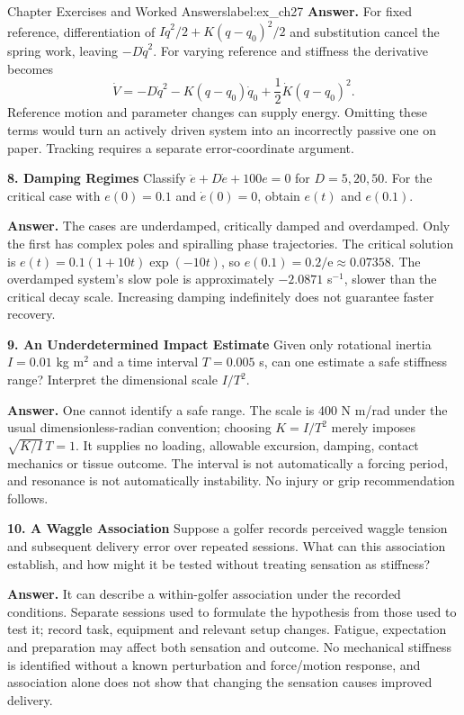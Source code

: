 \begin{exercises}{Chapter Exercises and Worked Answers}{label:ex_ch27}
\textbf{Answer.} For fixed reference, differentiation of $I\dot q^2/2+K(q-q_0)^2/2$ and substitution cancel the spring work, leaving $-D\dot q^2$. For varying reference and stiffness the derivative becomes
\[
\dot V=-D\dot q^2-K(q-q_0)\dot q_0+\frac12\dot K(q-q_0)^2.
\]
Reference motion and parameter changes can supply energy. Omitting these terms would turn an actively driven system into an incorrectly passive one on paper. Tracking requires a separate error-coordinate argument.

\textbf{8. Damping Regimes}
\label{ex:phase_portrait}
Classify $\ddot e+D\dot e+100e=0$ for $D=5,20,50$. For the critical case with $e(0)=0.1$ and $\dot e(0)=0$, obtain $e(t)$ and $e(0.1)$.

\textbf{Answer.} The cases are underdamped, critically damped and overdamped. Only the first has complex poles and spiralling phase trajectories. The critical solution is $e(t)=0.1(1+10t)\exp(-10t)$, so $e(0.1)=0.2/\mathrm e\approx0.07358$. The overdamped system's slow pole is approximately $-2.0871$ s$^{-1}$, slower than the critical decay scale. Increasing damping indefinitely does not guarantee faster recovery.

\textbf{9. An Underdetermined Impact Estimate}
\label{ex:impedance_tuning}
Given only rotational inertia $I=0.01$ kg m$^2$ and a time interval $T=0.005$ s, can one estimate a safe stiffness range? Interpret the dimensional scale $I/T^2$.

\textbf{Answer.} One cannot identify a safe range. The scale is 400 N m/rad under the usual dimensionless-radian convention; choosing $K=I/T^2$ merely imposes $\sqrt{K/I}\,T=1$. It supplies no loading, allowable excursion, damping, contact mechanics or tissue outcome. The interval is not automatically a forcing period, and resonance is not automatically instability. No injury or grip recommendation follows.

\textbf{10. A Waggle Association}
\label{ex:waggle_experiment}
Suppose a golfer records perceived waggle tension and subsequent delivery error over repeated sessions. What can this association establish, and how might it be tested without treating sensation as stiffness?

\textbf{Answer.} It can describe a within-golfer association under the recorded conditions. Separate sessions used to formulate the hypothesis from those used to test it; record task, equipment and relevant setup changes. Fatigue, expectation and preparation may affect both sensation and outcome. No mechanical stiffness is identified without a known perturbation and force/motion response, and association alone does not show that changing the sensation causes improved delivery.


\end{exercises}
